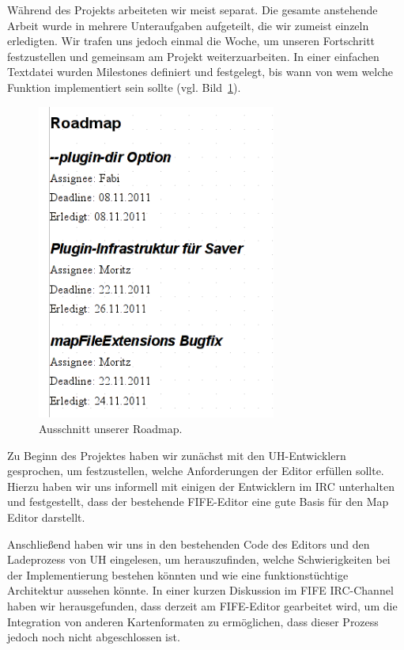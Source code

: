 Während des Projekts arbeiteten wir meist separat. Die gesamte anstehende Arbeit
wurde in mehrere Unteraufgaben aufgeteilt, die wir zumeist einzeln erledigten.
Wir trafen uns jedoch einmal die Woche, um unseren Fortschritt festzustellen und
gemeinsam am Projekt weiterzuarbeiten. In einer einfachen Textdatei wurden
Milestones definiert und festgelegt, bis wann von wem welche Funktion
implementiert sein sollte (vgl. Bild~\ref{figure:assignee}).

\begin{figure}[htbp]
  \centering

    \includegraphics[width=0.7\textwidth]{gfx/assignee.png}

  \caption{Ausschnitt unserer Roadmap.}
  \label{figure:assignee}
\end{figure}

Zu Beginn des Projektes haben wir zunächst mit den UH-Entwicklern gesprochen,
um festzustellen, welche Anforderungen der Editor erfüllen sollte. Hierzu
haben wir uns informell mit einigen der Entwicklern im IRC unterhalten und
festgestellt, dass der bestehende FIFE-Editor eine gute Basis für den Map
Editor darstellt.

Anschließend haben wir uns in den bestehenden Code des Editors und den Ladeprozess
von UH eingelesen, um herauszufinden, welche Schwierigkeiten bei der Implementierung
bestehen könnten und wie eine funktionstüchtige Architektur aussehen könnte.
In einer kurzen Diskussion im FIFE IRC-Channel haben wir herausgefunden, dass
derzeit am FIFE-Editor gearbeitet wird, um die Integration von anderen Kartenformaten
zu ermöglichen, dass dieser Prozess jedoch noch nicht abgeschlossen ist.

